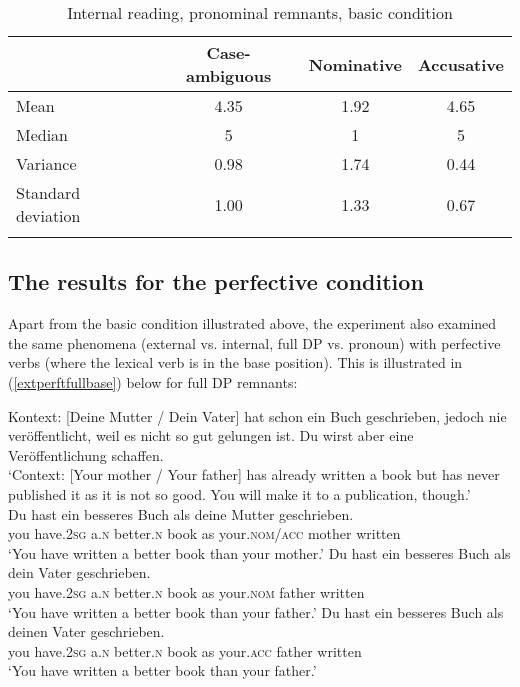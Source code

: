 \begin{table}
\begin{tabular}{l *3{S[table-format=1.2]}}
\lsptoprule
{} & {Case-ambiguous} & {Nominative} & {Accusative}\\
\midrule
Mean & 4.35 & 1.92 & 4.65\\
Median & 5 & 1 & 5\\
Variance & 0.98 & 1.74 & 0.44\\
Standard deviation & 1.00 & 1.33 & 0.67\\
\lspbottomrule
\end{tabular}
\caption{Internal reading, pronominal remnants, basic condition}
\label{tableintprespro}
\end{table} 


\subsection{The results for the perfective condition} \label{sec:6resultsperfective}
Apart from the basic condition illustrated above, the experiment also examined the same phenomena (external vs. internal, full DP vs. pronoun) with perfective verbs (where the lexical verb is in the base position). This is illustrated in (\ref{extperftfullbase}) below for full DP remnants:

\ea Kontext: [Deine Mutter / Dein Vater] hat schon ein Buch geschrieben, jedoch nie veröffentlicht, weil es nicht so gut gelungen ist. Du wirst aber eine Veröffentlichung schaffen. \label{extperftfullbase}\\
`Context: [Your mother / Your father] has already written a book but has never published it as it is not so good. You will make it to a publication, though.'\\
\ea \gll Du hast ein besseres Buch als deine Mutter geschrieben. \label{extperftfullbaseambig}\\
you have.\textsc{2sg} a.\textsc{n} better.\textsc{n} book as your.\textsc{nom/acc} mother written\\
\glt `You have written a better book than your mother.'
\ex \gll Du hast ein besseres Buch als dein Vater geschrieben. \label{extperftfullbasenom}\\
you have.\textsc{2sg} a.\textsc{n} better.\textsc{n} book as your.\textsc{nom} father written\\
\glt `You have written a better book than your father.'
\ex \gll Du hast ein besseres Buch als deinen Vater geschrieben. \label{extperftfullbaseacc}\\
you have.\textsc{2sg} a.\textsc{n} better.\textsc{n} book as your.\textsc{acc} father written\\
\glt `You have written a better book than your father.'
\z
\z

